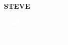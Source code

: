 \documentclass[9pt]{developercv} %
\begin{document}
\begin{tcolorbox}



\colorbox{secondary} {\begin{minipage}[t]{0.45\textwidth} 
	\vspace{-\baselineskip} %
	\vspace{10pt}	
	\colorbox{secondary_dark}{{\HUGE\textcolor{complement}{\textbf{\MakeUppercase{Steve}}}}} %
	
	\colorbox{secondary_dark}{{\HUGE\textcolor{white}{\textbf{\MakeUppercase{Gates}}}}} %
	\vspace{6	pt}
	
	\colorbox{secondary_dark}{\huge\textcolor{white}{Senior Backend Dev}}%
\end{minipage}

}
\end{tcolorbox}
\end{document}
